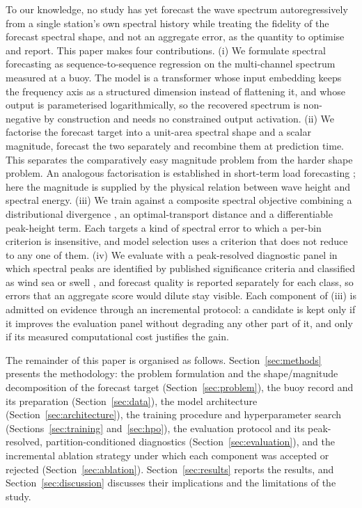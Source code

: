 To our knowledge, no study has yet forecast the wave spectrum autoregressively from a single
station's own spectral history while treating the fidelity of the forecast spectral shape, and not
an aggregate error, as the quantity to optimise and report. This paper makes four contributions.
(i) We formulate spectral forecasting as sequence-to-sequence regression on the multi-channel
spectrum measured at a buoy. The model is a transformer whose input embedding keeps the frequency
axis as a structured dimension instead of flattening it, and whose output is parameterised
logarithmically, so the recovered spectrum is non-negative by construction and needs no
constrained output activation. (ii) We factorise the forecast target into a unit-area spectral
shape and a scalar magnitude, forecast the two separately and recombine them at prediction time.
This separates the comparatively easy magnitude problem from the harder shape problem. An
analogous factorisation is established in short-term load forecasting
\citep{sevlian2018scaling, guo2026loadshape}; here the magnitude is supplied by the physical
relation between wave height and spectral energy. (iii) We train against a composite spectral
objective combining a distributional divergence \citep{kullback1951}, an optimal-transport
distance \citep{peyre2019} and a differentiable peak-height term. Each targets a kind of spectral
error to which a per-bin criterion is insensitive, and model selection uses a criterion that does
not reduce to any one of them. (iv) We evaluate with a peak-resolved diagnostic panel in which spectral
peaks are identified by published significance criteria and classified as wind sea or swell \citep{portilla2009}, and forecast quality is reported separately for each class, so errors that an aggregate score would
dilute stay visible. Each component of (iii) is admitted on evidence through an incremental protocol: a
candidate is kept only if it improves the evaluation panel without degrading any other part of it,
and only if its measured computational cost justifies the gain.

The remainder of this paper is organised as follows. Section~\ref{sec:methods} presents the
methodology: the problem formulation and the shape/magnitude decomposition of the forecast target
(Section~\ref{sec:problem}), the buoy record and its preparation (Section~\ref{sec:data}), the
model architecture (Section~\ref{sec:architecture}), the training procedure and hyperparameter
search (Sections~\ref{sec:training} and~\ref{sec:hpo}), the evaluation protocol and its
peak-resolved, partition-conditioned diagnostics (Section~\ref{sec:evaluation}), and the
incremental ablation strategy under which each component was accepted or rejected
(Section~\ref{sec:ablation}). Section~\ref{sec:results} reports the results, and
Section~\ref{sec:discussion} discusses their implications and the limitations of the study.
